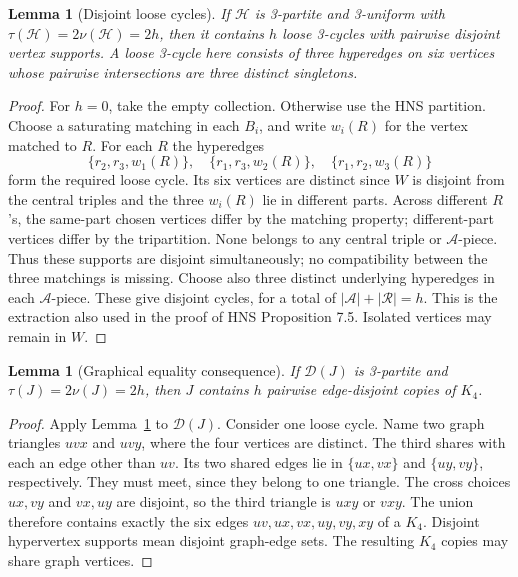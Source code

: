 \documentclass[11pt]{article}
\newtheorem{lemma}[theorem]{Lemma}
\theoremstyle{definition}\newtheorem{definition}[theorem]{Definition}
\theoremstyle{remark}\newtheorem{remark}[theorem]{Remark}
\newcommand{\D}{\mathcal D}
\begin{document}
\begin{lemma}[Disjoint loose cycles]\label{lem:cycles}
If $\mathcal H$ is 3-partite and 3-uniform with
$\tau(\mathcal H)=2\nu(\mathcal H)=2h$, then it contains $h$ loose
3-cycles with pairwise disjoint vertex supports. A loose 3-cycle here consists
of three hyperedges on six vertices whose pairwise intersections are three
distinct singletons.
\end{lemma}
\begin{proof}\leavevmode
For $h=0$, take the empty collection. Otherwise use the HNS partition.
Choose a saturating matching in each $B_i$, and write $w_i(R)$ for the
vertex matched to $R$. For each $R$ the hyperedges
\begin{equation}\label{eq:cycles}
\{r_2,r_3,w_1(R)\},\quad
\{r_1,r_3,w_2(R)\},\quad
\{r_1,r_2,w_3(R)\}
\end{equation}
form the required loose cycle. Its six vertices are distinct since
$W$ is disjoint from the central triples and the three $w_i(R)$ lie in
different parts. Across different $R$'s, the same-part chosen vertices
differ by the matching property; different-part vertices differ by the
tripartition. None belongs to any central triple or $\mathcal A$-piece.
Thus these supports are disjoint simultaneously; no compatibility between
the three matchings is missing. Choose also three distinct underlying
hyperedges in each $\mathcal A$-piece. These give disjoint cycles, for a
total of $|\mathcal A|+|\mathcal R|=h$. This is the extraction also used
in the proof of HNS Proposition 7.5. Isolated vertices may remain in $W$.
\end{proof}

\begin{lemma}[Graphical equality consequence]\label{lem:k4}
If $\D(J)$ is 3-partite and $\tau(J)=2\nu(J)=2h$, then $J$ contains
$h$ pairwise edge-disjoint copies of $K_4$.
\end{lemma}
\begin{proof}\leavevmode
Apply Lemma~\ref{lem:cycles} to $\D(J)$. Consider one loose cycle.
Name two graph triangles $uvx$ and $uvy$, where the four vertices are
distinct. The third shares with each an edge other than $uv$.
Its two shared edges lie in $\{ux,vx\}$ and $\{uy,vy\}$, respectively.
They must meet, since they belong to one triangle. The cross choices
$ux,vy$ and $vx,uy$ are disjoint, so the third triangle is $uxy$ or $vxy$.
The union therefore contains exactly the six edges
$uv,ux,vx,uy,vy,xy$ of a $K_4$. Disjoint hypervertex supports mean disjoint
graph-edge sets. The resulting $K_4$ copies may share graph vertices.
\end{proof}
\end{document}
